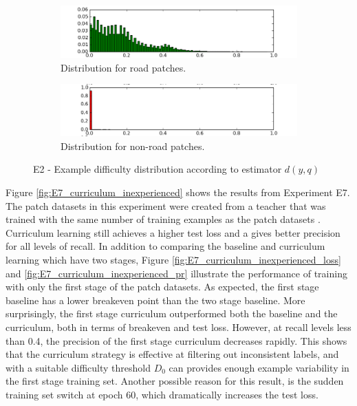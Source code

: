 \begin{figure}
\begin{subfigure}{0.48\textwidth}
\includegraphics[width=\linewidth]{figs/E2/E2-road-dist.png}
\caption{Distribution for road patches.} \label{fig:E2_difficulty_distribution_road}
\end{subfigure}
\hspace*{\fill} %
\begin{subfigure}{0.48\textwidth}
\includegraphics[width=\linewidth]{figs/E2/E2-non_road-dist.png}
\caption{Distribution for non-road patches.} \label{fig:E2_difficulty_distribution_nonroad}
\end{subfigure}
\hspace*{\fill} %
\caption{E2 - Example difficulty distribution according to estimator $d(y,q)$ } \label{fig:E2_difficulty_distribution}
\end{figure}

Figure \ref{fig:E7_curriculum_inexperienced} shows the results from Experiment E7. The patch datasets in this experiment were created from a teacher that was trained with the same number of training examples as the patch datasets . Curriculum learning still achieves a higher test loss and a gives better precision for all levels of recall. In addition to comparing the baseline and curriculum learning which have two stages, Figure \ref{fig:E7_curriculum_inexperienced_loss} and \ref{fig:E7_curriculum_inexperienced_pr} illustrate the performance of training with only the first stage of the patch datasets. As expected, the first stage baseline has a lower breakeven point than the two stage baseline. More surprisingly, the first stage curriculum outperformed both the baseline and the curriculum, both in terms of breakeven and test loss. However, at recall levels less than 0.4, the precision of the first stage curriculum decreases rapidly. This shows that the curriculum strategy is effective at filtering out inconsistent labels, and with a suitable difficulty threshold $D_0$ can provides enough example variability in the first stage training set. Another possible reason for this result, is the sudden training set switch at epoch 60, which dramatically increases the test loss. \\

